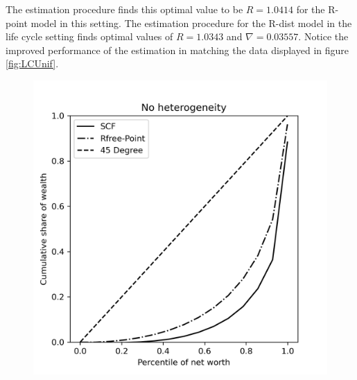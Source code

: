 \unskip

\par The estimation procedure finds this optimal value to be $R = 1.0414$ for the R-point model in this setting. The estimation procedure for the R-dist model in the life cycle setting finds optimal values of $R = 1.0343$ and $\nabla =0.03557$. Notice the improved performance of the estimation in matching the data displayed in figure \ref{fig:LCUnif}.

\begin{figure}[h]
    \centering
    \begin{minipage}{0.48\textwidth}
        \centering
        \includegraphics[width=\textwidth]{../Figures/LCrrPointNetWorthPlot.png}
    \end{minipage}
    \hfill
    \begin{minipage}{0.48\textwidth}
        \centering

\end{minipage}
\end{figure}
